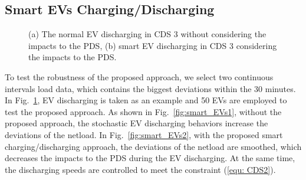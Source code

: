 \documentclass[final]{IEEEtran}
\begin{document}

\subsection{Smart EVs Charging/Discharging} 
\begin{figure}[!t]
	\begin{center}
		\caption{(a) The normal EV discharging in CDS 3 without considering the impacts to the PDS, (b) smart EV discharging in CDS 3 considering the impacts to the PDS.}\label{fig:smart_EVs}
	\end{center}
\end{figure}
To test the robustness of the proposed approach, we select two continuous intervals load data, which contains the biggest deviations within the 30 minutes. In Fig.~\ref{fig:smart_EVs}, EV discharging is taken as an example and 50 EVs are employed to test the proposed approach. As shown in Fig.~\ref{fig:smart_EVs1}, without the proposed approach, the stochastic EV discharging behaviors increase the deviations of the netload. In Fig.~\ref{fig:smart_EVs2}, with the proposed smart charging/discharging approach, the deviations of the netload are smoothed, which decreases the impacts to the PDS during the EV discharging. At the same time, the discharging speeds are controlled to meet the constraint (\ref{equ: CDS2}).
\end{document}
